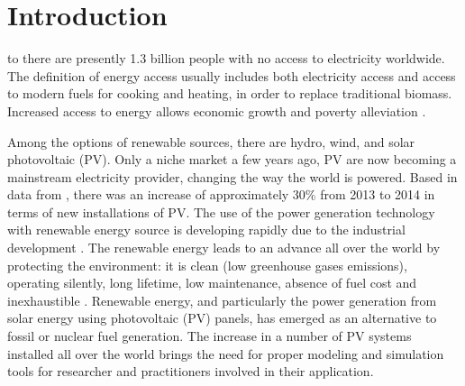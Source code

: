 \documentclass[journal]{IEEEtran}
\begin{document}
%
\IEEEpeerreviewmaketitle



\section{Introduction}
% 
% 
% 
% 
 to \cite{Coelho} there are presently 1.3 billion people with no access to electricity worldwide. The definition of energy access usually includes both electricity access and access to modern fuels for cooking and heating, in order to replace traditional biomass. Increased access to energy allows economic growth and poverty alleviation \cite{Karekesi}. 

Among the options of renewable sources, there are hydro, wind, and solar photovoltaic (PV). Only a niche market a few years ago, PV are now becoming a mainstream electricity provider, changing the way the world is powered. Based in data from \cite{EPIA}, there was an increase of approximately 30\% from 2013 to 2014 in terms of new installations of PV. The use of the power generation technology with renewable energy source is developing rapidly due to the industrial development \cite{Yatimi}. The renewable energy leads to an advance all over the world by protecting the environment: it is clean (low greenhouse gases emissions), operating silently, long lifetime, low maintenance, absence of fuel cost and inexhaustible \cite{Noroozian}. Renewable energy, and particularly the power generation from solar energy using photovoltaic (PV) panels, has emerged as an alternative to fossil or nuclear fuel generation. The increase in a number of PV systems installed all over the world brings the need for proper modeling and simulation tools for researcher and practitioners involved in their application. 
\end{document}
